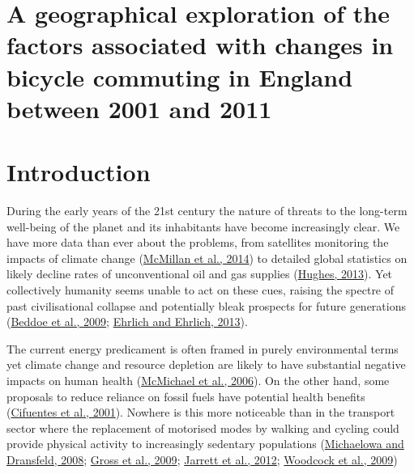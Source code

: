 \section{A geographical exploration of the factors associated with
changes in bicycle commuting in England between 2001 and
2011}\label{a-geographical-exploration-of-the-factors-associated-with-changes-in-bicycle-commuting-in-england-between-2001-and-2011}

\section{Introduction}\label{introduction}

During the early years of the 21st century the nature of threats to the
long-term well-being of the planet and its inhabitants have become
increasingly clear. We have more data than ever about the problems, from
satellites monitoring the impacts of climate change
(\href{http://onlinelibrary.wiley.com/doi/10.1002/2014GL060111/abstract}{McMillan
et al., 2014}) to detailed global statistics on likely decline rates of
unconventional oil and gas supplies
(\href{http://www.nature.com/nature/journal/v494/n7437/full/494307a.html}{Hughes,
2013}). Yet collectively humanity seems unable to act on these cues,
raising the spectre of past civilisational collapse and potentially
bleak prospects for future generations
(\href{http://www.pnas.org/content/106/8/2483.abstract}{Beddoe et al.,
2009};
\href{http://rspb.royalsocietypublishing.org/content/280/1754/20122845.full}{Ehrlich
and Ehrlich, 2013}).

The current energy predicament is often framed in purely environmental
terms yet climate change and resource depletion are likely to have
substantial negative impacts on human health
(\href{http://www.thelancet.com/journals/lancet/article/PIIS0140-6736\%2806\%2968079-3/abstract}{McMichael
et al., 2006}). On the other hand, some proposals to reduce reliance on
fossil fuels have potential health benefits
(\href{http://www.sciencemag.org/content/293/5533/1257.short}{Cifuentes
et al., 2001}). Nowhere is this more noticeable than in the transport
sector where the replacement of motorised modes by walking and cycling
could provide physical activity to increasingly sedentary populations
(\href{http://www.sciencedirect.com/science/article/B6VDY-4R00FMB-4/2/82bae464d0f4e053ced6751f608cbff9}{Michaelowa
and Dransfeld, 2008};
\href{http://www.ukerc.ac.uk/support/TransportReport}{Gross et al.,
2009}; \href{http://www.ncbi.nlm.nih.gov/pubmed/22682466}{Jarrett et
al., 2012}; \href{http://www.ncbi.nlm.nih.gov/pubmed/19942277}{Woodcock
et al., 2009})

